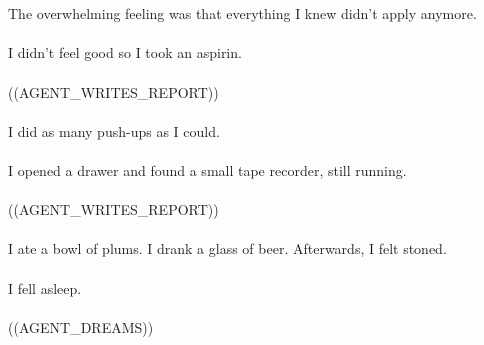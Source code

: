 \documentclass{article}
\begin{document}
    \section{}
    The overwhelming feeling was that everything I knew didn't apply anymore.\\\\I didn't feel good so I took an aspirin.\\\\((AGENT_WRITES_REPORT))\\\\I did as many push-ups as I could.\\\\I opened a drawer and found a small tape recorder, still running.\\\\((AGENT_WRITES_REPORT))\\\\I ate a bowl of plums. I drank a glass of beer. Afterwards, I felt stoned.\\\\I fell asleep.\\\\((AGENT_DREAMS))\\\\
    \newpage
    
    
\end{document}
